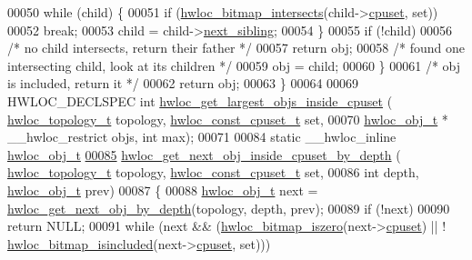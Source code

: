 \begin{DoxyCode}
00050     \textcolor{keywordflow}{while} (child) \{
00051       \textcolor{keywordflow}{if} (\hyperlink{a00205_gaefa070f9232857ba5a57297ea9a08ea2}{hwloc\_bitmap\_intersects}(child->\hyperlink{a00238_a67925e0f2c47f50408fbdb9bddd0790f}{cpuset}, \textcolor{keyword}{set}))
00052         \textcolor{keywordflow}{break};
00053       child = child->\hyperlink{a00238_a7f2343ed476fe4942e6fffd4cade1b40}{next\_sibling};
00054     \}
00055     \textcolor{keywordflow}{if} (!child)
00056       \textcolor{comment}{/* no child intersects, return their father */}
00057       \textcolor{keywordflow}{return} obj;
00058     \textcolor{comment}{/* found one intersecting child, look at its children */}
00059     obj = child;
00060   \}
00061   \textcolor{comment}{/* obj is included, return it */}
00062   \textcolor{keywordflow}{return} obj;
00063 \}
00064 
00069 HWLOC\_DECLSPEC \textcolor{keywordtype}{int} \hyperlink{a00195_ga34ca563fa3a6a4e05268f36a87668511}{hwloc\_get\_largest\_objs\_inside\_cpuset} (
      \hyperlink{a00186_ga9d1e76ee15a7dee158b786c30b6a6e38}{hwloc\_topology\_t} topology, \hyperlink{a00183_ga1f784433e9b606261f62d1134f6a3b25}{hwloc\_const\_cpuset\_t} \textcolor{keyword}{set},
00070                                                  \hyperlink{a00238}{hwloc\_obj\_t} * \_\_hwloc\_restrict objs, \textcolor{keywordtype}{int} max);
00071 
00084 \textcolor{keyword}{static} \_\_hwloc\_inline \hyperlink{a00238}{hwloc\_obj\_t}
\hyperlink{a00195_ga63e3784e7c60fbae5073428cb98ac787}{00085} \hyperlink{a00195_ga63e3784e7c60fbae5073428cb98ac787}{hwloc\_get\_next\_obj\_inside\_cpuset\_by\_depth} (
      \hyperlink{a00186_ga9d1e76ee15a7dee158b786c30b6a6e38}{hwloc\_topology\_t} topology, \hyperlink{a00183_ga1f784433e9b606261f62d1134f6a3b25}{hwloc\_const\_cpuset\_t} \textcolor{keyword}{set},
00086                                            \textcolor{keywordtype}{int} depth, \hyperlink{a00238}{hwloc\_obj\_t} prev)
00087 \{
00088   \hyperlink{a00238}{hwloc\_obj\_t} next = \hyperlink{a00187_gac140a9b939d9fa0b30c4a910efcb0656}{hwloc\_get\_next\_obj\_by\_depth}(topology, depth, 
      prev);
00089   \textcolor{keywordflow}{if} (!next)
00090     \textcolor{keywordflow}{return} NULL;
00091   \textcolor{keywordflow}{while} (next && (\hyperlink{a00205_ga5b64be28f5a7176ed8ad0d6a90bdf108}{hwloc\_bitmap\_iszero}(next->\hyperlink{a00238_a67925e0f2c47f50408fbdb9bddd0790f}{cpuset}) || !
      \hyperlink{a00205_ga0526e03db81956fb02acc8260b66d6a4}{hwloc\_bitmap\_isincluded}(next->\hyperlink{a00238_a67925e0f2c47f50408fbdb9bddd0790f}{cpuset}, \textcolor{keyword}{set})))

\end{DoxyCode}
